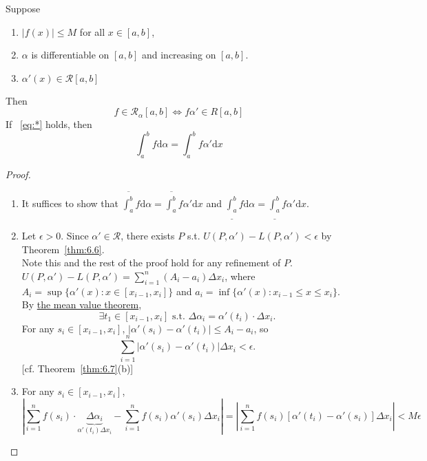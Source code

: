\begin{thm}[17]
	Suppose
	\begin{enumerate}
		\item $|f(x)|\le M$ for all $x \in [a,b]$,
		\item $\alpha$ is differentiable on $[a,b]$ and increasing on $[a,b]$.
		\item $\alpha'(x) \in \mathscr{R}[a,b]$
	\end{enumerate}
	Then
	\begin{equation*}
		\label{eq:*}
		f \in \mathscr{R}_{\alpha}[a,b]\Leftrightarrow f \alpha' \in R[a,b] \tag{*}
	\end{equation*}
	If ~\eqref{eq:*} holds, then
	\begin{equation*}
		\label{eq:**}
		\int_{a}^{b}{f\mathrm{d}\alpha}=\int_{a}^{b}{f\alpha'\mathrm{d}x}\tag{**}
	\end{equation*}
	\begin{proof}
		\begin{enumerate}[label=(\roman*)]
			\item
			      It suffices to show that $\overline{\int_{a}^{b}}{f\mathrm{d}\alpha}=\overline{\int_{a}^{b}}{f\alpha'\mathrm{d}x}$ and $\underline{\int_{a}^{b}}{f\mathrm{d}\alpha}=\underline{\int_{a}^{b}}{f\alpha'\mathrm{d}x}$.
			\item
			      Let $\epsilon>0$. Since $\alpha' \in \mathscr{R}$, there exists $P$ s.t. $U(P,\alpha')-L(P,\alpha')<\epsilon$ by Theorem~\ref{thm:6.6}.\\
			      Note this and the rest of the proof hold for any refinement of $P$.
			      $U(P,\alpha')-L(P,\alpha')=\sum_{i=1}^{n}{(A_i-a_i)}\Delta x_i$,
			      where $A_i=\sup\{\alpha'(x):x \in [x_{i-1},x_i]\}$ and $a_i=\inf\{\alpha'(x):x_{i-1}\le x\le x_i\}$.
			      By \hyperref[thm:mean-value-theorem]{the mean value theorem},
			      \[
				      \exists{t_1 \in [x_{i-1},x_{i}]} \text{ s.t. } \Delta \alpha_i=\alpha'(t_i) \cdot \Delta x_{i}
				      .\]
			      For any $s_i \in [x_{i-1},x_i]$, $\left|  \alpha'(s_i)-\alpha'(t_i)\right|\le A_{i}-a_{i}$, so
			      \[
				      \sum_{i=1}^{n}{\left|\alpha'(s_{i})-\alpha'(t_{i})\right| \Delta x_{i}}<\epsilon
				      .\]
			      [cf. Theorem~\ref{thm:6.7}(b)]
			\item
			      For any $s_i \in [x_{i-1},x_i]$,
			      \[
				      \left|\sum_{i=1}^{n}{f(s_{i})\cdot  \underbrace{\Delta \alpha_i}_{\alpha'(t_i) \Delta x_i}} - \sum_{i=1}^{n}{f(s_i)\alpha'(s_{i}) \Delta x_{i}}\right|
				      =\left|\sum_{i=1}^{n}{f(s_i)[\alpha'(t_i)-\alpha'(s_i)]\Delta x_i}\right|<M \epsilon
\]
\end{enumerate}
\end{proof}
\end{thm}

